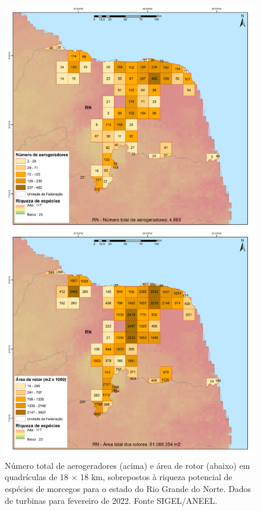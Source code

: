 \documentclass[
  oneside]{scrbook}
\begin{document}
\begin{figure}[H]

{\centering \includegraphics[width=0.75\linewidth]{imagens/cap09/Figura_9.8} 

}

\caption{Número total de aerogeradores (acima) e área de rotor (abaixo) em quadrículas de 18 × 18 km, sobrepostos à riqueza potencial de espécies de morcegos para o estado do Rio Grande do Norte. Dados de turbinas para fevereiro de 2022. Fonte SIGEL/ANEEL.}\label{fig:73}
\end{figure}
\end{document}
